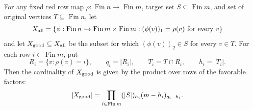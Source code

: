 \begin{lemma}
For any fixed red row map $\rho: \operatorname{Fin}n \to \operatorname{Fin}m$, target set $S \subseteq \operatorname{Fin}m$, and set of original vertices $T \subseteq \operatorname{Fin}n$, let
\[
X_{\rm all}
=\{\phi:\operatorname{Fin}n\hookrightarrow
\operatorname{Fin}m\times\operatorname{Fin}m:
(\phi(v))_1=\rho(v)\text{ for every }v\}
\]
and let $X_{\rm good} \subseteq X_{\rm all}$ be the subset for which $(\phi(v))_2 \in S$ for every $v \in T$.
For each row $i\in\operatorname{Fin}m$, put
\[
R_i=\{v:\rho(v)=i\},\qquad q_i=|R_i|,\qquad
T_i=T\cap R_i,\qquad h_i=|T_i|.
\]
Then the cardinality of $X_{\rm good}$ is given by the product over rows of the favorable factors:
\[
|X_{\rm good}| = \prod_{i\in\operatorname{Fin}m} (|S|)_{h_i} (m-h_i)_{q_i-h_i}.
\]
\end{lemma}
